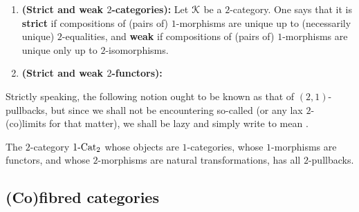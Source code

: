             \begin{definition} \label{def: strict_and_weak_2_categoriesand_2_functors}
                \noindent
                \begin{enumerate}
                    \item \textbf{(Strict and weak $2$-categories):} Let $\mathcal{K}$ be a $2$-category. One says that it is \textbf{strict} if compositions of (pairs of) $1$-morphisms are unique up to (necessarily unique) $2$-equalities, and \textbf{weak} if compositions of (pairs of) $1$-morphisms are unique only up to $2$-isomorphisms.
                    \item \textbf{(Strict and weak $2$-functors):}
                \end{enumerate}
            \end{definition}
            \begin{example}
                
            \end{example}
            
            Strictly speaking, the following notion ought to be known as that of $(2, 1)$-pullbacks, but since we shall not be encountering so-called  (or any lax $2$-(co)limits for that matter), we shall be lazy and simply write  to mean .
            \begin{definition}[$2$-pullbacks] \label{def: 2_pullbacks}
                
            \end{definition}
            \begin{example} \label{example: 2_pullbacks_in_the_2_category_of_categories}
                The $2$-category $1\text{-}\mathrm{Cat}_2$ whose objects are $1$-categories, whose $1$-morphisms are functors, and whose $2$-morphisms are natural transformations, has all $2$-pullbacks.
            \end{example}
    
    \subsection{(Co)fibred categories}
